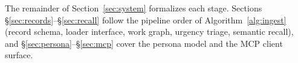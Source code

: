 The remainder of Section~\ref{sec:system} formalizes each stage. Sections
\S\ref{sec:records}--\S\ref{sec:recall} follow the pipeline order of
Algorithm~\ref{alg:ingest} (record schema, loader interface, work graph,
urgency triage, semantic recall), and \S\ref{sec:persona}--\S\ref{sec:mcp}
cover the persona model and the MCP client surface.
